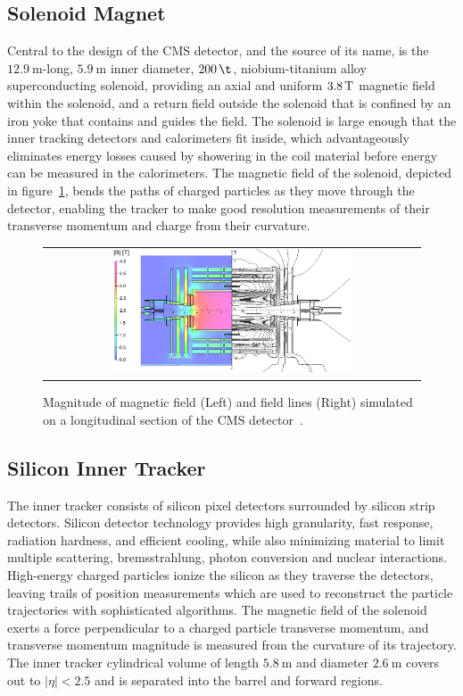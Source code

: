 \subsection{Solenoid Magnet}
Central to the design of the CMS detector, and the source of its name, is the $\SI{12.9}{\m}$-long, $\SI{5.9}{\m}$ inner diameter, $\SI{200}{\t}$, niobium-titanium alloy superconducting solenoid, providing an axial and uniform $\SI{3.8}{\T}$ magnetic field within the solenoid, and a return field outside the solenoid that is confined by an iron yoke that contains and guides the field.
The solenoid is large enough that the inner tracking detectors and calorimeters fit inside, which advantageously eliminates energy losses caused by showering in the coil material before energy can be measured in the calorimeters.
The magnetic field of the solenoid, depicted in figure~\ref{Solenoid}, bends the paths of charged particles as they move through the detector, enabling the tracker to make good resolution measurements of their transverse momentum and charge from their curvature.
\begin{figure}[!htb]
  \begin{center}
    \begin{tabular}{c}
        \includegraphics[width=0.65\textwidth]{fig_LHC_CMS/Solenoid.png}
    \end{tabular}
    \caption{Magnitude of magnetic field (Left) and field lines (Right) simulated on a longitudinal section of the CMS detector~\cite{Chatrchyan:1215500}.
            }
    \label{Solenoid}
  \end{center}
\end{figure}


\subsection{Silicon Inner Tracker}
The inner tracker consists of silicon pixel detectors surrounded by silicon strip detectors.
Silicon detector technology provides high granularity, fast response, radiation hardness, and efficient cooling, while also minimizing material to limit multiple scattering, bremsstrahlung, photon conversion and nuclear interactions.
High-energy charged particles ionize the silicon as they traverse the detectors, leaving trails of position measurements which are used to reconstruct the particle trajectories with sophisticated algorithms.
The magnetic field of the solenoid exerts a force perpendicular to a charged particle transverse momentum, and transverse momentum magnitude is measured from the curvature of its trajectory.
The inner tracker cylindrical volume of length $\SI{5.8}{\m}$ and diameter $\SI{2.6}{\m}$ covers out to $\vert \eta \vert < 2.5$ and is separated into the barrel and forward regions.

